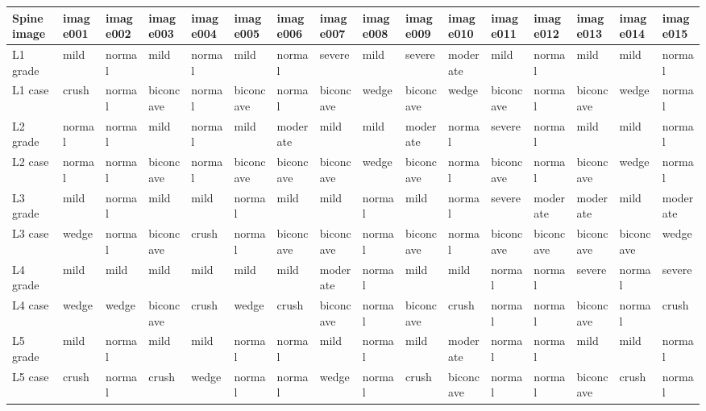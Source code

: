 \begin{tabular}{llllllllllllllll}
\toprule
Spine image & image001 & image002 &   image003 & image004 &   image005 &   image006 &   image007 & image008 &   image009 &   image010 &   image011 &   image012 &   image013 &   image014 &  image015 \\
\midrule
L1 grade &     mild &   normal &       mild &   normal &       mild &     normal &     severe &     mild &     severe &   moderate &       mild &     normal &       mild &       mild &    normal \\
L1 case  &    crush &   normal &  biconcave &   normal &  biconcave &     normal &  biconcave &    wedge &  biconcave &      wedge &  biconcave &     normal &  biconcave &      wedge &    normal \\
L2 grade &   normal &   normal &       mild &   normal &       mild &   moderate &       mild &     mild &   moderate &     normal &     severe &     normal &       mild &       mild &    normal \\
L2 case  &   normal &   normal &  biconcave &   normal &  biconcave &  biconcave &  biconcave &    wedge &  biconcave &     normal &  biconcave &     normal &  biconcave &      wedge &    normal \\
L3 grade &     mild &   normal &       mild &     mild &     normal &       mild &       mild &   normal &       mild &     normal &     severe &   moderate &   moderate &       mild &  moderate \\
L3 case  &    wedge &   normal &  biconcave &    crush &     normal &  biconcave &  biconcave &   normal &  biconcave &     normal &  biconcave &  biconcave &  biconcave &  biconcave &     wedge \\
L4 grade &     mild &     mild &       mild &     mild &       mild &       mild &   moderate &   normal &       mild &       mild &     normal &     normal &     severe &     normal &    severe \\
L4 case  &    wedge &    wedge &  biconcave &    crush &      wedge &      crush &  biconcave &   normal &  biconcave &      crush &     normal &     normal &  biconcave &     normal &     crush \\
L5 grade &     mild &   normal &       mild &     mild &     normal &     normal &       mild &   normal &       mild &   moderate &     normal &     normal &       mild &       mild &    normal \\
L5 case  &    crush &   normal &      crush &    wedge &     normal &     normal &      wedge &   normal &      crush &  biconcave &     normal &     normal &  biconcave &      crush &    normal \\
\bottomrule
\end{tabular}
